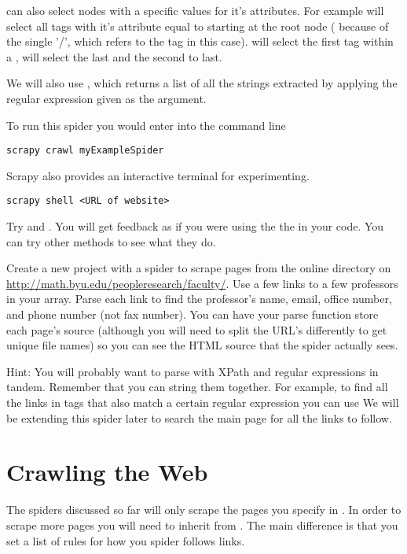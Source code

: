  can also select nodes with a specific values for it's attributes. 
For example  will select all  tags with it's  attribute equal to  starting at the root node ( because of the single '/', which refers to the  tag in this case). 
 will select the first  tag within a ,  will select the last and  the second to last.

We will also use , which returns a list of all the strings extracted by applying the regular expression given as the argument.

To run this spider you would enter into the command line
\begin{lstlisting}
scrapy crawl myExampleSpider
\end{lstlisting}

Scrapy also provides an interactive terminal for experimenting.
\begin{lstlisting}
scrapy shell <URL of website>
\end{lstlisting}

Try  and . You will get feedback as if you were using the the  in your code. You can try other methods to see what they do.

\begin{problem}
Create a new project with a spider to scrape pages from the online directory on \url{http://math.byu.edu/peopleresearch/faculty/}.
Use a few links to a few professors in your  array.
Parse each link to find the professor's name, email, office number, and phone number (not fax number).
You can have your parse function store each page's source (although you will need to split the URL's differently to get unique file names) so you can see the HTML source that the spider actually sees.

Hint: You will probably want to parse with XPath and regular expressions in tandem. Remember that you can string them together.
For example, to find all the  links in  tags that also match a certain regular expression you can use 
We will be extending this spider later to search the main page for all the links to follow.
\end{problem}

\section*{Crawling the Web}
The spiders discussed so far will only scrape the pages you specify in .
In order to scrape more pages you will need to inherit from .
The main difference is that you set a list of rules for how you spider follows links.

